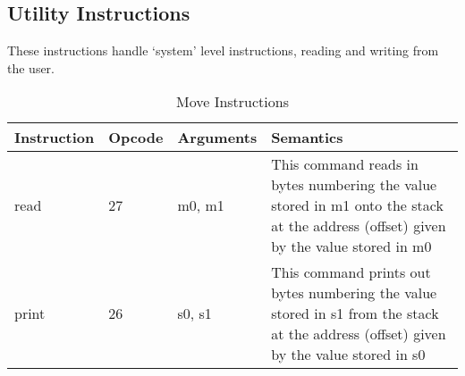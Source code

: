 \clearpage
\subsection{Utility Instructions}
These instructions handle `system' level instructions, reading and writing from the user.
\begin{table}[h!]
	\centering
	\caption{Move Instructions}
	\begin{tabular}{|l|l|l|p{8cm}|}
		\hline
		Instruction & Opcode & Arguments & Semantics \\\hline
		       read & 27 & m0, m1 & This command reads in bytes numbering the value stored
		in m1 onto the stack at the address (offset) given by the value stored in m0\\\hline
		       print & 26 & s0, s1 & This command prints out bytes numbering the value stored
		in s1 from the stack at the address (offset) given by the value stored in s0\\\hline
	\end{tabular}
\end{table}

